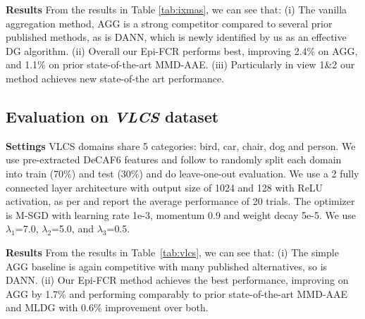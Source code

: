 \documentclass[10pt,twocolumn,letterpaper]{article}
\newcommand{\doublecheck}[1]{\textcolor{black}{#1}}
\newcommand{\keypoint}[1]{\vspace{0.1cm}\noindent\textbf{#1}\quad}
\newcommand{\cut}[1]{}
\begin{document}
\keypoint{Results} From the results in Table \ref{tab:ixmas}, we can see that: (i) The vanilla aggregation method, AGG is a strong competitor compared to several prior published methods, as is DANN, which is newly identified by us as an effective DG algorithm. (ii) Overall our Epi-FCR performs best, improving 2.4\% on AGG, and 1.1\% on prior state-of-the-art MMD-AAE. (iii) Particularly in view 1\&2 our method achieves new state-of-the art performance. 


\subsection{Evaluation on \textbf{\textit{VLCS}} dataset}

\keypoint{Settings} VLCS domains share 5 categories: bird, car, chair, dog and person. We use  pre-extracted DeCAF6 features and follow \cite{motiian2017CCSA} to randomly split each domain into train (70\%) and test (30\%) and do leave-one-out evaluation. We use a 2 fully connected layer architecture with output size of 1024 and 128 with ReLU activation, as per \cite{motiian2017CCSA} and report the average performance of 20 trials. The optimizer is M-SGD with learning rate 1e-3, momentum 0.9 and weight decay 5e-5. We use $\lambda_1$=7.0, $\lambda_2$=5.0, and $\lambda_3$=0.5. 



\keypoint{Results} From the results in Table~\ref{tab:vlcs}, we can see that: (i) The simple AGG baseline is again competitive with many published alternatives, so is DANN.  (ii) Our Epi-FCR method achieves the best performance, improving on AGG by 1.7\% and performing comparably to prior state-of-the-art MMD-AAE and MLDG with  0.6\% improvement over both. 




\cut{\keypoint{Sensitivity analysis of loss weights} \doublecheck{We did some analysis to check to check the sensitivity of the model to the different loss weights, ie, $\lambda_1, \lambda_2, \lambda_3$. First we activate the loss weight $\lambda_1$, its value is selected from $[0,1.0,3.0,5.0,7.0]$, we can see that the model performance stably increases upon the increase of $\lambda_1$ where it reaches a peak performance when $\lambda_1=7.0$. Second, we activate the loss weight $\lambda_2$, similarly its value is obtained from $[0,1.0,3.0,5.0,7.0]$. Training classifier is not as stable as training the feature extractor, its performance fluctuates upon the change of $\lambda_2$. Then, we check the loss weight $\lambda_3$ by choosing it from $[0, 0.1, 0.5, 1.0, 3.0, 5.0]$, it is seen that slightly activating it gives some performance boost indicating its strong constraint to the feature extractor. But we need to be careful of controlling it as we see the performance drops when we make this constraint stronger.}}
\end{document}
